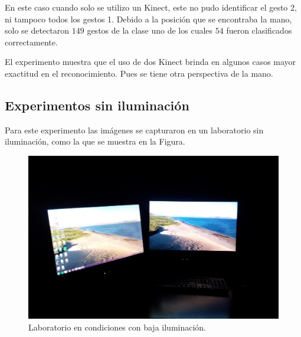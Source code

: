 \begin{itemize}
En este caso cuando solo se utilizo un Kinect, este no pudo identificar el gesto 2, ni tampoco todos los gestos 1. Debido a la posición que se encontraba la mano, solo se detectaron $149$ gestos de la clase uno de los cuales $54$ fueron clasificados correctamente.

El experimento muestra que el uso de dos Kinect brinda en algunos casos mayor exactitud en el reconocimiento. Pues se tiene otra perspectiva de la mano. 

\end{itemize}


\subsection{Experimentos sin iluminación}
Para este experimento las imágenes se capturaron en un laboratorio sin iluminación, como la que se muestra en la Figura.

\begin{figure}[h!]
\begin{center} 
\includegraphics[scale=0.09]{./Figures/noIluminacion.jpg}
\end{center}
\caption{Laboratorio en condiciones con baja iluminación.}
\label{fig:LabNoIluminado} 
\end{figure} 


